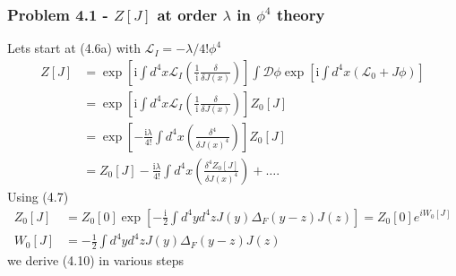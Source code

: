 \documentclass[10pt,a4paper]{article}
\theoremstyle{definition}
\begin{document}
\subsubsection{Problem 4.1 - \texorpdfstring{$Z[J]$}{Lg} at order \texorpdfstring{$\lambda$}{Lg} in \texorpdfstring{$\phi^4$}{Lg} theory}
Lets start at (4.6a) with $\mathscr{L}_I=-\lambda/4!\phi^4$
\begin{align}
    Z[J]&=\exp\left[\text{i}\int d^4x\mathscr{L}_I\left(\frac{1}{\text{i}}\frac{\delta}{\delta J(x)}\right)\right]\int\mathcal{D}\phi\exp\left[\text{i}\int d^4x(\mathscr{L}_0+J\phi)\right]\\
    &=\exp\left[\text{i}\int d^4x\mathscr{L}_I\left(\frac{1}{\text{i}}\frac{\delta}{\delta J(x)}\right)\right]Z_0[J]\\
    &=\exp\left[-\frac{\text{i}\lambda}{4!}\int d^4x\left(\frac{\delta^4 }{\delta J(x)^4}\right)\right]Z_0[J]\\
    &=Z_0[J]-\frac{\text{i}\lambda}{4!}\int d^4x\left(\frac{\delta^4 Z_0[J]}{\delta J(x)^4}\right)+\dots.
\end{align}
Using (4.7)
\begin{align}
    Z_0[J]&=Z_0[0]\exp\left[-\frac{\text{i}}{2}\int d^4yd^4zJ(y)\Delta_F(y-z)J(z)\right]=Z_0[0]e^{iW_0[J]}\\
    W_0[J]&=-\frac{1}{2}\int d^4yd^4zJ(y)\Delta_F(y-z)J(z)
\end{align}
we derive (4.10) in various steps 
\end{document}
